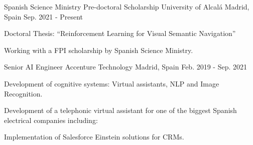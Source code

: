 
\begin{cventries}

    \cventry
    {Spanish Science Ministry Pre-doctoral Scholarship} %
    {University of Alcalá} %
    {Madrid, Spain} %
    {Sep. 2021 - Present} %
    {
        \begin{cvitems} %
            \item {Doctoral Thesis: ``Reinforcement Learning for Visual Semantic Navigation”}
            \item {Working with a FPI scholarship by Spanish Science Ministry.}
        \end{cvitems}
    }

    \cventry
    {Senior AI Engineer} %
    {Accenture Technology} %
    {Madrid, Spain} %
    {Feb. 2019 - Sep. 2021} %
    {
        \begin{cvitems} %
            \item {Development of cognitive systems: Virtual assistants, NLP and Image Recognition.}
            \item {Development of a telephonic virtual assistant for one of the biggest Spanish electrical companies including: }
            \item {Implementation of Salesforce Einstein solutions for CRMs.}
        \end{cvitems}
    }


\end{cventries}
